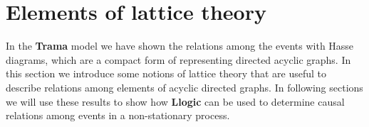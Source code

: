 \documentclass[
		twoside,openright,titlepage,numbers=noenddot,manychapters,
		headinclude,%
                footinclude=false,cleardoublepage=empty,
                BCOR=5mm,
		fontsize=11pt, %
                 enabledeprecatedfontcommands]{scrreprt}
\begin{document}





\section{Elements of lattice theory}

In the \textbf{Trama} model we have shown the relations among the events with Hasse diagrams, which are a compact form of representing directed acyclic graphs. %
In this section we introduce some notions of lattice theory that are useful to describe relations among elements of acyclic directed graphs.
 In following sections we will use these results to show  how \textbf{Llogic} can be used to determine causal relations among events in a non-stationary process. 
\end{document}
